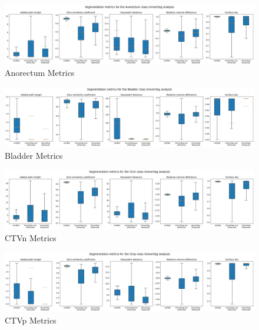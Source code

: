 \documentclass[11pt,twoside]{report}
\begin{document}
\begin{landscape}

  \begin{figure}[H]
    \centering
    \includegraphics[width=\linewidth]{../../research/source/code/data/metrics/metricsanorectum_1_combinednotable_UniverSeg_analysis.png}
    \caption{Anorectum Metrics}\label{fig:universeg-metrics-anorectum}
  \end{figure}

  \begin{figure}[H]
    \centering
    \includegraphics[width=\linewidth]{../../research/source/code/data/metrics/metricsbladder_1_combinednotable_UniverSeg_analysis.png}
    \caption{Bladder Metrics}\label{fig:universeg-metrics-bladder}
  \end{figure}

  \begin{figure}[H]
    \centering
    \includegraphics[width=\linewidth]{../../research/source/code/data/metrics/metricsctvn_1_combinednotable_UniverSeg_analysis.png}
    \caption{CTVn Metrics}\label{fig:universeg-metrics-ctvn}
  \end{figure}

  \begin{figure}[H]
    \centering
    \includegraphics[width=\linewidth]{../../research/source/code/data/metrics/metricsctvp_1_combinednotable_UniverSeg_analysis.png}
    \caption{CTVp Metrics}\label{fig:universeg-metrics-ctvp}
  \end{figure}


\end{landscape}
\end{document}
